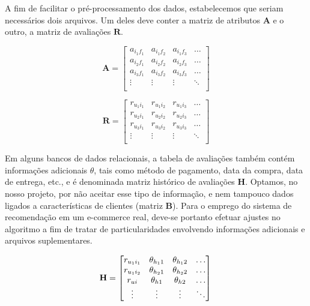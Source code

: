 A fim de facilitar o pré-processamento dos dados, estabelecemos que seriam necessários dois arquivos. Um deles deve conter a matriz de atributos $\mathbf{A}$ e o outro, a matriz de avaliações  $\mathbf{R}$. 

\begin{equation} 
\mathbf{A} = 
\begin{bmatrix} 
 a_{i_1 f_1} &  a_{i_1 f_2} &  a_{i_1 f_3}  & \dots   \\
 a_{i_2 f_1} &  a_{i_2 f_2} &  a_{i_2 f_3}  & \dots   \\
 a_{i_3 f_1} &  a_{i_3 f_2} &  a_{i_3 f_3}  & \dots  \\ 
 \vdots &  \vdots &  \vdots  & \ddots   \\
 \end{bmatrix}
\end{equation}


\begin{equation}
	  \mathbf{R} = 
\begin{bmatrix} 
  r_{u_1 i_1} &  r_{u_1 i_2} &  r_{u_1 i_3}  & \dots   \\
 r_{u_2 i_1} &  r_{u_2 i_2} &  r_{u_2 i_3}  & \dots   \\
 r_{u_3 i_1} &  r_{u_3 i_2} &  r_{u_3 i_3}  & \dots  \\ 
 \vdots &  \vdots &  \vdots  & \ddots   \\
\end{bmatrix}
\end{equation}

Em alguns bancos de dados relacionais, a tabela de avaliações também contém informações adicionais $\theta$, tais como método de pagamento, data da compra, data de entrega, etc., e é denominada matriz histórico de avaliações $\mathbf{H}$. Optamos, no nosso projeto, por não aceitar esse tipo de informação, e nem tampouco dados ligados a características de clientes (matriz $\mathbf{B}$). Para o emprego do sistema de recomendação em um e-commerce real, deve-se portanto efetuar ajustes no algoritmo a fim de tratar de particularidades envolvendo informações adicionais e arquivos suplementares.

\begin{equation} 
\mathbf{H} =
\begin{bmatrix} 
 r_{u_1 i_1} &  \theta_{h_1 1} &  \theta_{h_1 2} & \dots   \\
 r_{u_1 i_2} &  \theta_{h_2 1} &  \theta_{h_2 2} & \dots   \\
 r_{u i} &  \theta_{h 1} &  \theta_{h 2} & \dots   \\
 \vdots &  \vdots &  \vdots  & \ddots   \\
 \end{bmatrix} \\
\end{equation}

